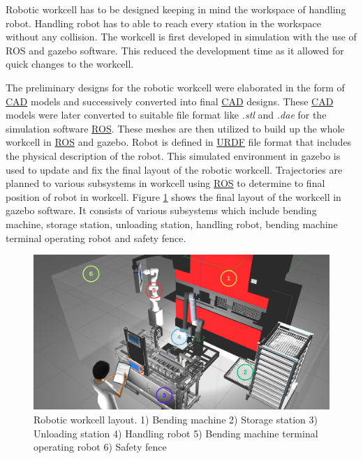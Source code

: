 
Robotic workcell has to be designed keeping in mind the workspace of handling robot. Handling robot has to able to reach every station in the workspace without any collision. 
The workcell is first developed in simulation with the use of ROS and gazebo software. This reduced the development time as it allowed for quick changes to the workcell.

The preliminary designs for the robotic workcell were elaborated
in the form of \hyperref[acro:CAD]{CAD} models and successively converted into final \hyperref[acro:CAD]{CAD} designs. 
These \hyperref[acro:CAD]{CAD} models were later converted to suitable file format like \textit{.stl} and \textit{.dae} for the simulation software \hyperref[acro:ROS]{ROS}.
These meshes are then utilized to build up the whole workcell in \hyperref[acro:ROS]{ROS} and gazebo. Robot is defined in \hyperref[acro:URDF]{URDF} file format that includes
the physical description of the robot. \cite{urdf} This simulated environment in gazebo is used to update and fix the final layout of the robotic workcell.
Trajectories are planned to various subsystems in workcell using \hyperref[acro:ROS]{ROS} to determine to final position of robot in workcell.
Figure \ref{fig:robotic-workcell} shows the final layout of the workcell in gazebo software.
It consists of various subsystems which include bending machine, storage station, unloading station, handling robot, bending machine terminal operating robot and safety fence.

\begin{figure}[h]
    \centering
    \includegraphics[width=\textwidth]{figures/robotic-workcell1.png}
    \caption{Robotic workcell layout. 1) Bending machine 2) Storage station 3) Unloading station 4) Handling robot 5) Bending machine terminal operating robot 6) Safety fence}
    \label{fig:robotic-workcell}
\end{figure}

